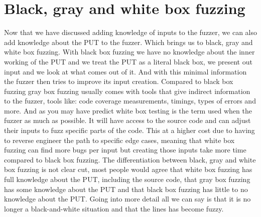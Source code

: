 \section{Black, gray and white box fuzzing}
Now that we have discussed adding knowledge of inputs to the fuzzer, we can also add knowledge about the PUT to the fuzzer. Which brings us to black, gray and white box fuzzing. With black box fuzzing we have no knowledge about the inner working of the PUT and we treat the PUT as a literal black box, we present out input and we look at what comes out of it. And with this minimal information the fuzzer then tries to improve its input creation. 
Compared to black box fuzzing gray box fuzzing usually comes with tools that give indirect information to the fuzzer, tools like: code coverage measurements, timings, types of errors and more.
And as you may have predict white box testing is the term used when the fuzzer as much as possible. It will have access to the source code and can adjust their inputs to fuzz specific parts of the code. This at a higher cost due to having to reverse engineer the path to specific edge cases, meaning that white box fuzzing can find more bugs per input but creating those inputs take more time compared to black box fuzzing.
The differentiation between black, gray and white box fuzzing is not clear cut, most people would agree that white box fuzzing has full knowledge about the PUT, including the source code, that gray box fuzzing has some knowledge about the PUT and that black box fuzzing has little to no knowledge about the PUT. Going into more detail all we can say is that it is no longer a black-and-white situation and that the lines has become fuzzy. 


